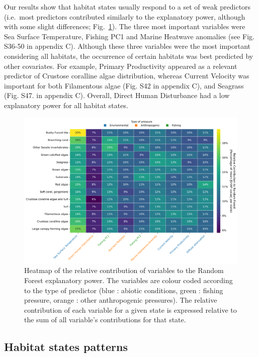 \begin{refsection}
Our results show that habitat states usually respond to a set of weak
predictors (i.e.~most predictors contributed similarly to the
explanatory power, although with some slight differences;
Fig.~\ref{fig:chap3fig1}). The three most important variables were Sea
Surface Temperature, Fishing PC1 and Marine Heatwave anomalies (see Fig.
S36-50 in appendix C). Although these three variables were the most
important considering all habitats, the occurrence of certain habitats
was best predicted by other covariates. For example, Primary
Productivity appeared as a relevant predictor of Crustose coralline
algae distribution, whereas Current Velocity was important for both
Filamentous algae (Fig. S42 in appendix C), and Seagrass (Fig. S47. in
appendix C). Overall, Direct Human Disturbance had a low explanatory
power for all habitat states.

\begin{figure}
\hypertarget{fig:chap3fig1}{%
\centering
\includegraphics{03-Chapitre3/figures/04-states_hab_shap_matrix_normalized.png}
\caption[Heatmap of the relative contribution of variables to the Random
Forest explanatory power.]{Heatmap of the relative contribution of variables to the Random
Forest explanatory power. The variables are colour coded according to
the type of predictor (blue : abiotic conditions, green : fishing
pressure, orange : other anthropogenic pressures). The relative
contribution of each variable for a given state is expressed relative to
the sum of all variable's contributions for that
state.}\label{fig:chap3fig1}
}
\end{figure}

\hypertarget{habitat-states-patterns}{%
\subsection{Habitat states patterns}\label{habitat-states-patterns}}


\end{refsection}
